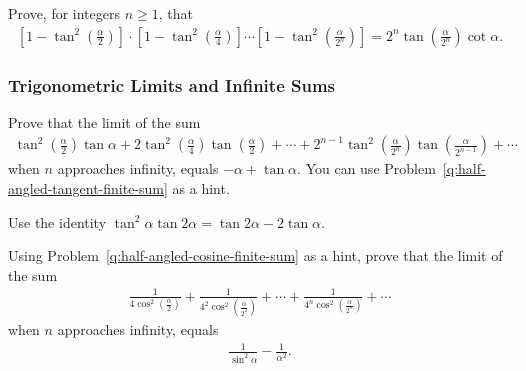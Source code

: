 \begin{question}
    Prove, for integers $n\geq 1$, that
    \begin{align*}
        \left[1 - \tan^2\left(\frac{\alpha}{2}\right)\right] \cdot
        \left[1 - \tan^2\left(\frac{\alpha}{4}\right)\right]
        \cdots \left[1 - \tan^2\left(\frac{\alpha}{2^n}\right)\right] = 2^n\tan\left(\frac{\alpha}{2^n}\right)\cot \alpha.
    \end{align*}
\end{question}


\subsubsection{Trigonometric Limits and Infinite Sums}


\begin{question}\label{q:half-angled-tangent-infinite-sum}
    Prove that the limit of the sum
    \begin{align*}
        \tan^2\left(\frac{\alpha}{2}\right)\tan \alpha + 2\tan^2\left(\frac{\alpha}{4}\right)\tan\left(\frac{\alpha}{2}\right)+ \cdots + 2^{n-1}\tan^2\left(\frac{\alpha}{2^n}\right)\tan\left(\frac{\alpha}{2^{n-1}}\right)+\cdots
    \end{align*}
    when $n$ approaches infinity, equals $-\alpha+\tan \alpha$. You can use Problem~\ref{q:half-angled-tangent-finite-sum} as a hint.
\end{question}

\begin{solution}
    Use the identity $\tan^2\alpha\tan 2\alpha = \tan 2\alpha - 2\tan \alpha$.
\end{solution}


\begin{question}\label{q:half-angled-cosine-infinite-sum}
    Using Problem~\ref{q:half-angled-cosine-finite-sum} as a hint, prove that the limit of the sum
    \begin{align*}
        \frac{1}{\displaystyle 4\cos^2\left(\frac{\alpha}{2}\right)}+\frac{1}{\displaystyle 4^2\cos^2\left(\frac{\alpha}{2^2}\right)} + \cdots + \frac{1}{\displaystyle 4^n\cos^2\left(\frac{\alpha}{2^n}\right)}+\cdots
    \end{align*}
    when $n$ approaches infinity, equals
    \begin{align*}
        \frac{1}{\sin^2 \alpha} - \frac{1}{\alpha^2}.
    \end{align*}
\end{question}


